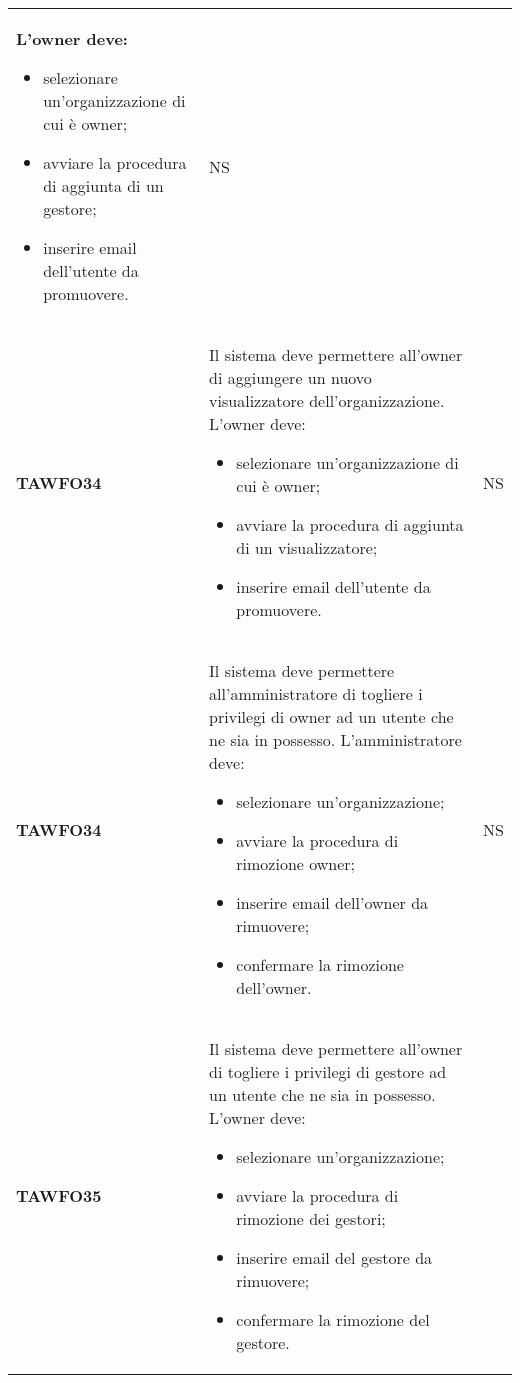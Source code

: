 \documentclass[../piano-di-qualifica.tex]{subfiles}
\begin{document}
\begin{centering}
\begin{longtable}[H]{>{\centering\bfseries}m{3cm} >{}p{10cm} >{\centering\arraybackslash}m{3cm}}
        L'owner deve:
        \begin{itemize}
         \item selezionare un'organizzazione di cui è owner;
         \item avviare la procedura di aggiunta di un gestore;
         \item inserire email dell'utente da promuovere.
        \end{itemize}
        & NS \\
        TAWFO34      & Il sistema deve permettere all’owner di aggiungere un nuovo visualizzatore dell’organizzazione.    \newline
        L'owner deve:
        \begin{itemize}
         \item selezionare un'organizzazione di cui è owner;
         \item avviare la procedura di aggiunta di un visualizzatore;
         \item inserire email dell'utente da promuovere.
        \end{itemize}
        & NS \\
        TAWFO34      & Il sistema deve permettere all’amministratore di togliere i privilegi di owner ad un utente che ne sia in possesso.    \newline
        L'amministratore deve:
        \begin{itemize}
         \item selezionare un'organizzazione;
         \item avviare la procedura di rimozione owner;
         \item inserire email dell'owner da rimuovere;
         \item confermare la rimozione dell'owner.
        \end{itemize}
        & NS \\
        TAWFO35      & Il sistema deve permettere all’owner di togliere i privilegi di gestore ad un utente che ne sia in possesso. \newline
        L'owner deve:
        \begin{itemize}
         \item selezionare un'organizzazione;
         \item avviare la procedura di rimozione dei gestori;
         \item inserire email del gestore da rimuovere;
         \item confermare la rimozione del gestore.

\end{itemize}
\end{longtable}
\end{centering}
\end{document}
